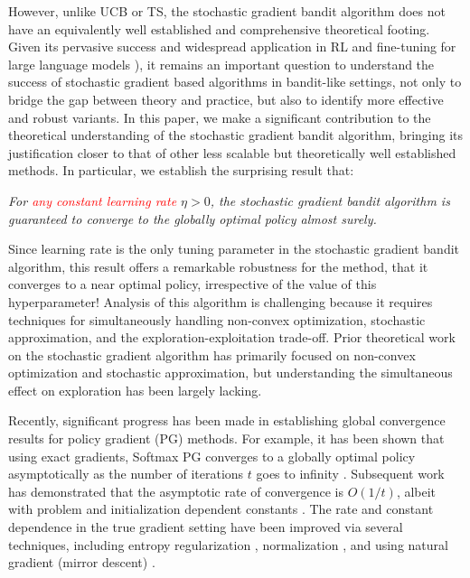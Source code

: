 However, unlike UCB or TS, the stochastic gradient bandit algorithm does not have an equivalently well established and comprehensive theoretical footing. Given its pervasive success and widespread application in RL \citep{schulman2017proximal} and fine-tuning for large language models \citep{ouyang2022training,rafailov2024direct}), it remains an important question to understand the success of stochastic gradient based algorithms in bandit-like settings, not only to bridge the gap between theory and practice, but also to identify more effective and robust variants. %
In this paper, we make a significant contribution to the theoretical understanding of the stochastic gradient bandit algorithm, bringing its justification closer to that of other less scalable but theoretically well established methods.
In particular, we establish the surprising result that:
\begin{center}
\emph{For \textcolor{red}{any constant learning rate} $\eta>0$, the stochastic gradient bandit algorithm is guaranteed to converge to the globally optimal policy almost surely.}
\end{center}
Since learning rate is the only tuning parameter in the stochastic gradient bandit algorithm, this result offers a remarkable robustness for the method, that it converges to a near optimal policy, irrespective of the value of this hyperparameter!
Analysis of this algorithm is challenging because it requires techniques for simultaneously handling non-convex optimization, stochastic approximation, and the exploration-exploitation trade-off. %
Prior theoretical work on the stochastic gradient algorithm has primarily focused on
non-convex optimization and stochastic approximation, but understanding the simultaneous effect on exploration has been largely lacking.

Recently, significant progress has been made in establishing global convergence results for policy gradient (PG) methods. For example, it has been shown that using exact gradients, Softmax PG converges to a globally optimal policy asymptotically as the number of iterations $t$ goes to infinity \citep{agarwal2021theory}. Subsequent work has demonstrated that the asymptotic rate of convergence is $O(1/t) $\citep{mei2020global}, albeit with problem and initialization dependent constants \citep{mei2020escaping,li2021softmax}. The rate and constant dependence in the true gradient setting have been improved via several techniques, including entropy regularization \citep{mei2020global}, normalization \citep{mei2021leveraging}, and using natural gradient (mirror descent) \citep{agarwal2021theory,cen2022fast,lan2023policy}.

